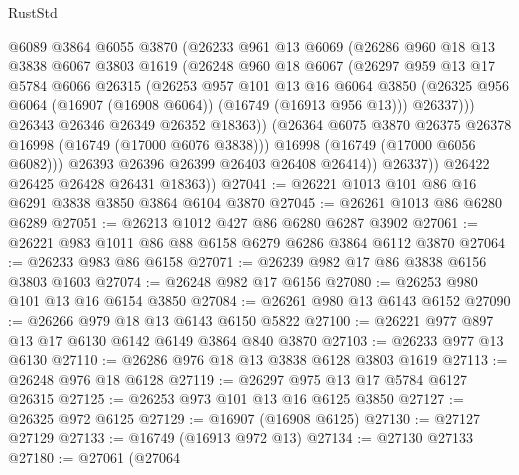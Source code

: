 \begin{lexlean}{RustStd}
\begin{coremodule}
                  @6089
                  @3864
                  @6055
                  @3870
                  (@26233
                    @961
                    @13
                    @6069
                    (@26286
                      @960
                      @18
                      @13
                      @3838
                      @6067
                      @3803
                      @1619
                      (@26248
                        @960
                        @18
                        @6067
                        (@26297
                          @959
                          @13
                          @17
                          @5784
                          @6066
                          @26315
                          (@26253
                            @957
                            @101
                            @13
                            @16
                            @6064
                            @3850
                            (@26325 @956 @6064 (@16907 (@16908 @6064)) (@16749 (@16913 @956 @13)))
                            @26337)))
                      @26343
                      @26346
                      @26349
                      @26352
                      @18363))
                  (@26364 @6075 @3870 @26375 @26378 @16998 (@16749 (@17000 @6076 @3838)))
                  @16998
                  (@16749 (@17000 @6056 @6082)))
                @26393
                @26396
                @26399
                @26403
                @26408
                @26414))
            @26337))
        @26422
        @26425
        @26428
        @26431
        @18363))
@27041 := @26221 @1013 @101 @86 @16 @6291 @3838 @3850 @3864 @6104 @3870
@27045 := @26261 @1013 @86 @6280 @6289
@27051 := @26213 @1012 @427 @86 @6280 @6287 @3902
@27061 := @26221 @983 @1011 @86 @88 @6158 @6279 @6286 @3864 @6112 @3870
@27064 := @26233 @983 @86 @6158
@27071 := @26239 @982 @17 @86 @3838 @6156 @3803 @1603
@27074 := @26248 @982 @17 @6156
@27080 := @26253 @980 @101 @13 @16 @6154 @3850
@27084 := @26261 @980 @13 @6143 @6152
@27090 := @26266 @979 @18 @13 @6143 @6150 @5822
@27100 := @26221 @977 @897 @13 @17 @6130 @6142 @6149 @3864 @840 @3870
@27103 := @26233 @977 @13 @6130
@27110 := @26286 @976 @18 @13 @3838 @6128 @3803 @1619
@27113 := @26248 @976 @18 @6128
@27119 := @26297 @975 @13 @17 @5784 @6127 @26315
@27125 := @26253 @973 @101 @13 @16 @6125 @3850
@27127 := @26325 @972 @6125
@27129 := @16907 (@16908 @6125)
@27130 := @27127 @27129
@27133 := @16749 (@16913 @972 @13)
@27134 := @27130 @27133
@27180 := @27061
    (@27064

\end{coremodule}
\end{lexlean}
